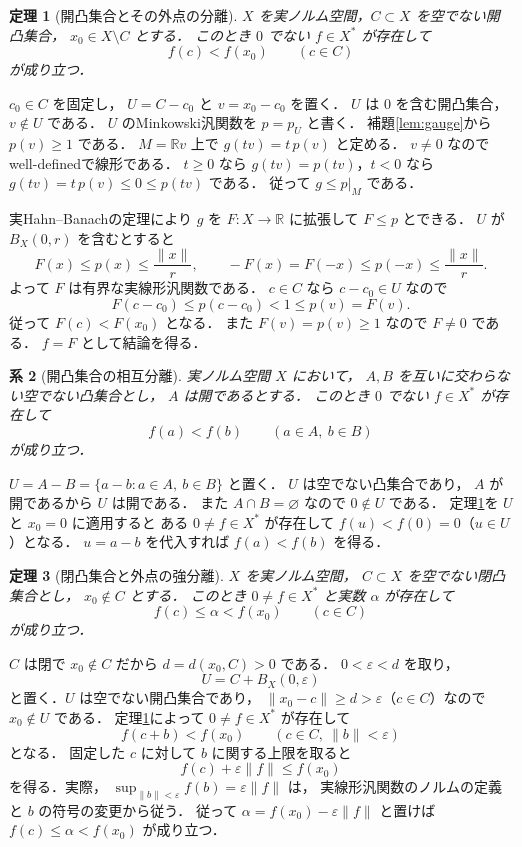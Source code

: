 \documentclass[a5paper,10pt,onecolumn]{jsarticle}
\makeatletter
\theoremstyle{mathnotetheorem}
\newtheorem{theorem}{定理}[section]
\newtheorem{corollary}[theorem]{系}
\renewcommand{\proofname}{証明}
\renewenvironment{proof}[1][\proofname]{%
  \par\pushQED{\qed}\normalfont\topsep4\p@\@plus2\p@\relax
  \trivlist\item[\hskip\labelsep\bfseries #1]\ignorespaces
}{\popQED\endtrivlist\@endpefalse}
\makeatother
\begin{document}
\begin{theorem}[開凸集合とその外点の分離]\label{thm:open-sep}
$X$ を実ノルム空間，$C\subset X$ を空でない開凸集合，
$x_0\in X\setminus C$ とする．
このとき $0$ でない $f\in X^*$ が存在して
\[
 f(c)<f(x_0)\qquad(c\in C)
\]
が成り立つ．
\end{theorem}
\begin{proof}
$c_0\in C$ を固定し，
$U=C-c_0$ と $v=x_0-c_0$ を置く．
$U$ は $0$ を含む開凸集合，$v\notin U$ である．
$U$ のMinkowski汎関数を $p=p_U$ と書く．
補題\ref{lem:gauge}から $p(v)\ge1$ である．
$M=\mathbb Rv$ 上で
$g(tv)=t\,p(v)$ と定める．
$v\ne0$ なのでwell-definedで線形である．
$t\ge0$ なら
$g(tv)=p(tv)$，$t<0$ なら
$g(tv)=t\,p(v)\le0\le p(tv)$ である．
従って $g\le p|_M$ である．

実Hahn--Banachの定理により $g$ を
$F:X\to\mathbb R$ に拡張して $F\le p$ とできる．
$U$ が $B_X(0,r)$ を含むとすると
\[
 F(x)\le p(x)\le\frac{\|x\|}{r},
 \qquad
 -F(x)=F(-x)\le p(-x)\le\frac{\|x\|}{r}.
\]
よって $F$ は有界な実線形汎関数である．
$c\in C$ なら $c-c_0\in U$ なので
\[
 F(c-c_0)\le p(c-c_0)<1
 \le p(v)=F(v).
\]
従って $F(c)<F(x_0)$ となる．
また $F(v)=p(v)\ge1$ なので $F\ne0$ である．
$f=F$ として結論を得る．
\end{proof}

\begin{corollary}[開凸集合の相互分離]
実ノルム空間 $X$ において，
$A,B$ を互いに交わらない空でない凸集合とし，
$A$ は開であるとする．
このとき $0$ でない $f\in X^*$ が存在して
\[
 f(a)<f(b)\qquad(a\in A,\ b\in B)
\]
が成り立つ．
\end{corollary}
\begin{proof}
$U=A-B=\{a-b:a\in A,\ b\in B\}$ と置く．
$U$ は空でない凸集合であり，
$A$ が開であるから $U$ は開である．
また $A\cap B=\varnothing$ なので $0\notin U$ である．
定理\ref{thm:open-sep}を $U$ と $x_0=0$ に適用すると
ある $0\ne f\in X^*$ が存在して
$f(u)<f(0)=0$（$u\in U$）となる．
$u=a-b$ を代入すれば $f(a)<f(b)$ を得る．
\end{proof}

\begin{theorem}[閉凸集合と外点の強分離]\label{thm:strong-sep}
$X$ を実ノルム空間，
$C\subset X$ を空でない閉凸集合とし，
$x_0\notin C$ とする．
このとき $0\ne f\in X^*$ と実数 $\alpha$ が存在して
\[
 f(c)\le\alpha<f(x_0)\qquad(c\in C)
\]
が成り立つ．
\end{theorem}
\begin{proof}
$C$ は閉で $x_0\notin C$ だから
$d=d(x_0,C)>0$ である．
$0<\varepsilon<d$ を取り，
\[
 U=C+B_X(0,\varepsilon)
\]
と置く．$U$ は空でない開凸集合であり，
$\|x_0-c\|\ge d>\varepsilon$（$c\in C$）なので
$x_0\notin U$ である．
定理\ref{thm:open-sep}によって
$0\ne f\in X^*$ が存在して
\[
 f(c+b)<f(x_0)\qquad
 (c\in C,\ \|b\|<\varepsilon)
\]
となる．
固定した $c$ に対して $b$ に関する上限を取ると
\[
 f(c)+\varepsilon\|f\|\le f(x_0)
\]
を得る．実際，
$\sup_{\|b\|<\varepsilon}f(b)=\varepsilon\|f\|$ は，
実線形汎関数のノルムの定義と $b$ の符号の変更から従う．
従って
$\alpha=f(x_0)-\varepsilon\|f\|$
と置けば
$f(c)\le\alpha<f(x_0)$ が成り立つ．
\end{proof}
\end{document}
